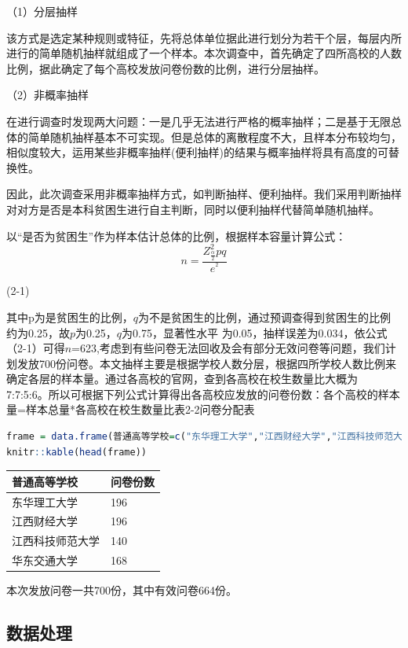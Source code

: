 \documentclass[UTF8,a4paper,12pt]{ctexart}  %
\begin{document}
（1）分层抽样

该方式是选定某种规则或特征，先将总体单位据此进行划分为若干个层，每层内所进行的简单随机抽样就组成了一个样本。本次调查中，首先确定了四所高校的人数比例，据此确定了每个高校发放问卷份数的比例，进行分层抽样。

（2）非概率抽样

在进行调查时发现两大问题：一是几乎无法进行严格的概率抽样；二是基于无限总体的简单随机抽样基本不可实现。但是总体的离散程度不大，且样本分布较均匀，相似度较大，运用某些非概率抽样(便利抽样)的结果与概率抽样将具有高度的可替换性。

因此，此次调查采用非概率抽样方式，如判断抽样、便利抽样。我们采用判断抽样对对方是否是本科贫困生进行自主判断，同时以便利抽样代替简单随机抽样。

以``是否为贫困生''作为样本估计总体的比例，根据样本容量计算公式：
\[n=\frac{Z_{\frac{\alpha }{2}}^{2}pq}{e^{^{2}}}\]

(2-1)

其中p为是贫困生的比例，\(q\)为不是贫困生的比例，通过预调查得到贫困生的比例约为0.25，故\(p\)为0.25，\(q\)为0.75，显著性水平 为0.05，抽样误差为0.034，依公式（2-1）可得\(n\)=623,考虑到有些问卷无法回收及会有部分无效问卷等问题，我们计划发放700份问卷。本文抽样主要是根据学校人数分层，根据四所学校人数比例来确定各层的样本量。通过各高校的官网，查到各高校在校生数量比大概为 7:7:5:6。所以可根据下列公式计算得出各高校应发放的问卷份数：各个高校的样本量=样本总量*各高校在校生数量比表2-2问卷分配表

\begin{lstlisting}[language=R]
frame = data.frame(普通高等学校=c("东华理工大学","江西财经大学","江西科技师范大学","华东交通大学"),问卷份数=c("196","196","140","168"))
knitr::kable(head(frame))
\end{lstlisting}

\begin{tabular}{l|l}
\hline
普通高等学校 & 问卷份数\\
\hline
东华理工大学 & 196\\
\hline
江西财经大学 & 196\\
\hline
江西科技师范大学 & 140\\
\hline
华东交通大学 & 168\\
\hline
\end{tabular}

本次发放问卷一共700份，其中有效问卷664份。

\hypertarget{section-18}{%
\subsection{数据处理}\label{section-18}}
\end{document}
